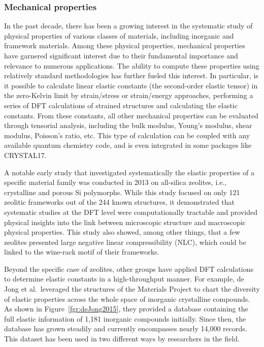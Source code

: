 \documentclass[main.tex]{subfiles}
\begin{document}
\subsubsection{Mechanical properties}

In the past decade, there has been a growing interest in the systematic study of physical properties of various classes of materials, including inorganic and framework materials. Among these physical properties, mechanical properties have garnered significant interest due to their fundamental importance and relevance to numerous applications. The ability to compute these properties using relatively standard methodologies has further fueled this interest. In particular, is it possible to calculate linear elastic constants (the second-order elastic tensor) in the zero-Kelvin limit by strain/stress or strain/energy approaches, performing a series of DFT calculations of strained structures and calculating the elastic constants. From these constants, all other mechanical properties can be evaluated through tensorial analysis,\autocite{Marmier_2010} including the bulk modulus, Young's modulus, shear modulus, Poisson's ratio, etc. This type of calculation can be coupled with any available quantum chemistry code,\autocite{Golesorkhtabar_2013} and is even integrated in some packages like CRYSTAL17.\autocite{Dovesi_2018}

A notable early study that investigated systematically the elastic properties of a specific material family was conducted in 2013 on all-silica zeolites,\autocite{Coudert_2013} i.e., crystalline and porous Si polymorphs. While this study focused on only 121 zeolitic frameworks out of the 244 known structures, it demonstrated that systematic studies at the DFT level were computationally tractable and provided physical insights into the link between microscopic structure and macroscopic physical properties. This study also showed, among other things, that a few zeolites presented large negative linear compressibility (NLC), which could be linked to the wine-rack motif of their frameworks.

Beyond the specific case of zeolites, other groups have applied DFT calculations to determine elastic constants in a high-throughput manner. For example, de Jong et al.\ leveraged the structures of the Materials Project\autocite{Matgenome, Jain_2013} to chart the diversity of elastic properties across the whole space of inorganic crystalline compounds.\autocite{deJong_2015} As shown in Figure~\ref{fgr:deJong2015}, they provided a database containing the full elastic information of 1,181 inorganic compounds initially. Since then, the database has grown steadily and currently encompasses nearly 14,000 records.\autocite{MaterialsProject} This dataset has been used in two different ways by researchers in the field.
\end{document}
